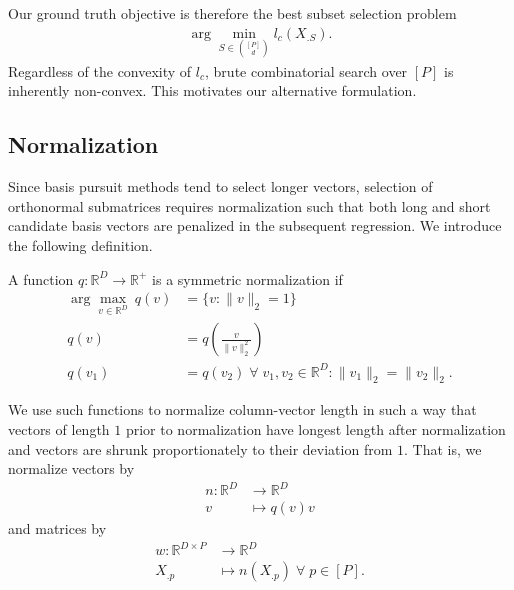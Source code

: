 
Our ground truth objective is therefore the best subset selection problem
\begin{align}
\label{prog:ground_truth}
\arg \min_{ S \in \binom{[P]}{d}} l_c ( X_{. S}).
\end{align}
Regardless of the convexity of $l_c$, brute combinatorial search over $[P]$ is inherently non-convex.
This motivates our alternative formulation.

\subsection{Normalization}
\label{sec:normalization}

Since basis pursuit methods tend to select longer vectors, selection of orthonormal submatrices requires normalization such that both long and short candidate basis vectors are penalized in the subsequent regression.
We introduce the following definition.

\begin{definition}
A function $q: \mathbb R^D \to \mathbb R^+ $ is a symmetric normalization if 
\begin{align}
\arg \max_{v \in \mathbb R^D} \ q (v) &=\{ v : \|v\|_2 = 1 \} \\
q(v) &= q(\frac{v}{\|v\|_2^2}) \\
q(v_1) &= q(v_2) \; \forall \; v_1, v_2 \in \mathbb R^D : \|v_1\|_2 = \|v_2\|_2.
\end{align} \label{def:symmetric_normalization}
\end{definition}

We use such functions to normalize column-vector length in such a way that vectors of length $1$ prior to normalization have longest length after normalization and vectors are shrunk proportionately to their deviation from $1$. 
That is, we normalize vectors by 
\begin{align}
n: \mathbb R^D  &\to \mathbb R^D \\
v &\mapsto {q(v) }v
\end{align}
and matrices by
\begin{align}
w: \mathbb R^{D \times P}  &\to \mathbb R^D \\
 X_{.p} &\mapsto n( X_{.p}) \; \forall \; p \in [P].
\end{align}

